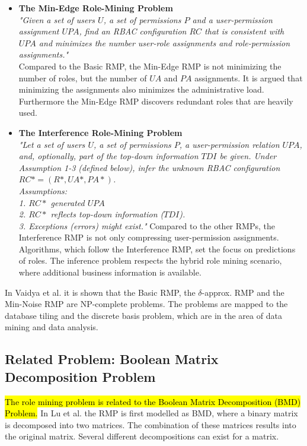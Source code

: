 \begin{itemize}
        \item \textbf{The Min-Edge Role-Mining Problem}\cite{Vaidya:2009}\\
        \textit{"Given a set of users $U$, a set of permissions $P$ and a user-permission assignment $UPA$, find an RBAC configuration $RC$ that is consistent with $UPA$ and minimizes the number user-role assignments and role-permission assignments."}\\
        Compared to the Basic RMP, the Min-Edge RMP is not minimizing the number of roles, but the number of $UA$ and $PA$ assignments. It is argued that minimizing the assignments also minimizes the administrative load. Furthermore the Min-Edge RMP discovers redundant roles that are heavily used\cite{4497438}.
        
        \item \textbf{The Interference Role-Mining Problem}\cite{Frank:2013}\\
        \textit{"Let a set of users $U$, a set of permissions $P$, a user-permission relation $UPA$, and, optionally, part of the top-down information $TDI$ be given. Under Assumption 1-3 (defined below), infer the unknown RBAC configuration $RC*=(R*, UA*, PA*)$.\\
        Assumptions:\\
        1. $RC*$ generated $UPA$\\
        2. $RC*$ reflects top-down information ($TDI$).\\
        3. Exceptions (errors) might exist."}
	    Compared to the other RMPs, the Interference RMP is not only compressing user-permission assignments. Algorithms, which follow the Interference RMP, set the focus on predictions of roles. The inference problem respects the hybrid role mining scenario, where additional business information is available.  
    \end{itemize}
    
    In Vaidya et al.\cite{Vaidya:2007} it is shown that the Basic RMP, the $\delta$-approx. RMP and the Min-Noise RMP are NP-complete problems. The problems are mapped to the database tiling and the discrete basis problem, which are in the area of data mining and data analysis.
    
    \subsection{Related Problem: Boolean Matrix Decomposition Problem}
    \hl{The role mining problem is related to the Boolean Matrix Decomposition (BMD) Problem.} In Lu et al.\cite{4497438} the RMP is first modelled as BMD, where a binary matrix is decomposed into two matrices. The combination of these matrices results into the original matrix. Several different decompositions can exist for a matrix.
    
